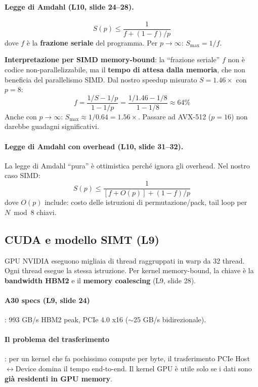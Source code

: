 \documentclass[11pt,a4paper]{article}
\begin{document}
\paragraph{Legge di Amdahl (L10, slide 24--28).}
$$S(p) \leq \frac{1}{f + (1-f)/p}$$
dove $f$ è la \textbf{frazione seriale} del programma. Per $p \to \infty$: $S_\text{max} = 1/f$.

\textbf{Interpretazione per SIMD memory-bound}: la ``frazione seriale'' $f$ non è codice non-parallelizzabile, ma il \textbf{tempo di attesa dalla memoria}, che non beneficia del parallelismo SIMD. Dal nostro speedup misurato $S = 1.46\times$ con $p=8$:
$$f = \frac{1/S - 1/p}{1 - 1/p} = \frac{1/1.46 - 1/8}{1 - 1/8} \approx 64\%$$
Anche con $p \to \infty$: $S_\text{max} \approx 1/0.64 = 1.56\times$. Passare ad AVX-512 ($p=16$) non darebbe guadagni significativi.

\paragraph{Legge di Amdahl con overhead (L10, slide 31--32).}
La legge di Amdahl ``pura'' è ottimistica perché ignora gli overhead. Nel nostro caso SIMD:
$$S(p) \leq \frac{1}{[f + O(p)] + (1-f)/p}$$
dove $O(p)$ include: costo delle istruzioni di permutazione/pack, tail loop per $N \bmod 8$ chiavi.


\subsection{CUDA e modello SIMT (L9)}

\begin{theorybox}[title=\textbf{Modello SIMT (L9, slide 2--5)}]
GPU NVIDIA eseguono migliaia di thread raggruppati in warp da 32 thread. Ogni thread esegue la stessa istruzione. Per kernel memory-bound, la chiave è la \textbf{bandwidth HBM2} e il \textbf{memory coalescing} (L9, slide 28).
\end{theorybox}

\paragraph{A30 specs (L9, slide 24)}: 993 GB/s HBM2 peak, PCIe 4.0 x16 ($\sim$25 GB/s bidirezionale).

\paragraph{Il problema del trasferimento}: per un kernel che fa pochissimo compute per byte, il trasferimento PCIe Host$\leftrightarrow$Device domina il tempo end-to-end. Il kernel GPU è utile solo se i dati sono \textbf{già residenti in GPU memory}.
\end{document}
